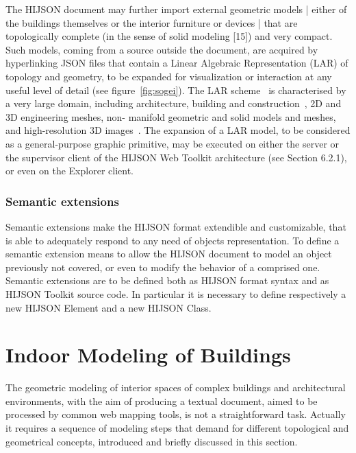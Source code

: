 \documentclass[]{egpubl}
\begin{document}
The HIJSON document may further import external geometric models | either of
the buildings themselves or the interior furniture or devices | that are
topologically complete (in the sense of solid modeling [15]) and very compact.
Such models, coming from a source outside the document, are acquired by
hyperlinking JSON files that contain a Linear Algebraic Representation (LAR)
of topology and geometry, to be expanded for visualization or interaction at
any useful level of detail (see figure~\ref{fig:sogei}). The LAR
scheme~\cite{Dicarlo:2014:TNL:2543138.2543294} is characterised by a very
large domain, including architecture, building and
construction~\cite{paoluzziMS:2014}, 2D and 3D engineering meshes, non-
manifold geometric and solid models and meshes, and high-resolution 3D
images~\cite{cadanda:2015}.  The expansion of a LAR model, to be considered as
a general-purpose graphic primitive, may be executed on either the server or
the supervisor client of the HIJSON Web Toolkit architecture (see Section
6.2.1), or even on the Explorer client.


\subsubsection{Semantic extensions} Semantic extensions make the HIJSON format
extendible and customizable, that is able to adequately respond to any need of
objects representation. To define a semantic extension means to allow the
HIJSON document to model an object previously not covered, or even to modify
the behavior of a comprised one. Semantic extensions are to be defined both as
HIJSON format syntax and as HIJSON Toolkit source code. In particular it is
necessary to define respectively a new HIJSON Element and a new HIJSON Class.


\section{Indoor Modeling of Buildings}

The geometric modeling of interior spaces of complex buildings and architectural environments, with the aim of producing a textual document, aimed to be processed by common web mapping tools,  is not a straightforward task. Actually it requires a sequence of modeling steps that demand for different topological and geometrical concepts, introduced and briefly discussed in this section.

\end{document}
